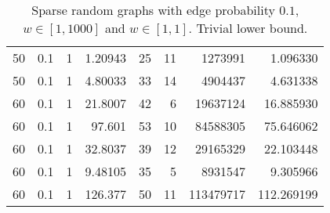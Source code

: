 \documentclass[a4paper,11pt]{article}
\begin{document}
\begin{table}
\begin{center}
\begin{tabular}{|rrr|r|r|rr|r|}
50 & 0.1 & 1 & 1.20943 & 25 & 11 & 1273991 & 1.096330 \\
50 & 0.1 & 1 & 4.80033 & 33 & 14 & 4904437 & 4.631338 \\
60 & 0.1 & 1 & 21.8007 & 42 & 6 & 19637124 & 16.885930 \\
60 & 0.1 & 1 & 97.601 & 53 & 10 & 84588305 & 75.646062 \\
60 & 0.1 & 1 & 32.8037 & 39 & 12 & 29165329 & 22.103448 \\
60 & 0.1 & 1 & 9.48105 & 35 & 5 & 8931547 & 9.305966 \\
60 & 0.1 & 1 & 126.377 & 50 & 11 & 113479717 & 112.269199 \\
\hline
\end{tabular}
\end{center}
\caption{Sparse random graphs with edge probability $0.1$,
  $w\in[1,1000]$ and $w\in[1,1]$. Trivial lower bound.}
\label{tab:sparse-norebal}
\end{table}
\end{document}
